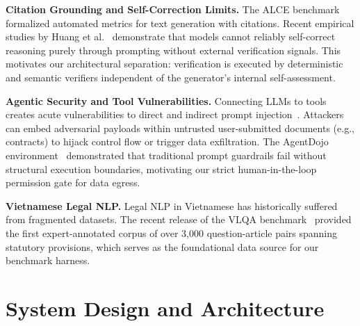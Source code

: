 \documentclass[a4paper,11pt]{article}
\newcommand{\hdr}[1]{\vspace{3pt}\noindent\textbf{#1}}
\begin{document}
\hdr{Citation Grounding and Self-Correction Limits.} The ALCE benchmark~\citep{gao2023alce} formalized automated metrics for text generation with citations. Recent empirical studies by Huang et al.~\citep{huang2024selfcorrect} demonstrate that models cannot reliably self-correct reasoning purely through prompting without external verification signals. This motivates our architectural separation: verification is executed by deterministic and semantic verifiers independent of the generator's internal self-assessment.

\hdr{Agentic Security and Tool Vulnerabilities.} Connecting LLMs to tools creates acute vulnerabilities to direct and indirect prompt injection~\citep{greshake2023indirect}. Attackers can embed adversarial payloads within untrusted user-submitted documents (e.g., contracts) to hijack control flow or trigger data exfiltration. The AgentDojo environment~\citep{debenedetti2024agentdojo} demonstrated that traditional prompt guardrails fail without structural execution boundaries, motivating our strict human-in-the-loop permission gate for data egress.

\hdr{Vietnamese Legal NLP.} Legal NLP in Vietnamese has historically suffered from fragmented datasets. The recent release of the VLQA benchmark~\citep{vlqa2025} provided the first expert-annotated corpus of over 3,000 question-article pairs spanning statutory provisions, which serves as the foundational data source for our benchmark harness.

\section{System Design and Architecture}
\end{document}
